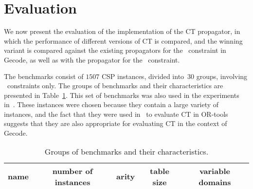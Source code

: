 \documentclass[a4paper,11pt]{article}
\theoremstyle{definition}
\newcommand{\Table}{\Constraint{Table}}
\newcommand{\CTpaper}[0]{DBLP:conf/cp/DemeulenaereHLP16}
\numberwithin{equation}{section}
\begin{document}








\section{Evaluation}
\label{evaluation}

We now present the evaluation of the implementation of the CT propagator,
in which the performance of different versions of CT is compared,
and the winning variant is compared against the existing propagators for
the \Table~constraint in Gecode, as well as with the propagator for the
~constraint.

The benchmarks consist of $1507$ CSP instances, divided into~$30$ groups,
involving \Table~constraints only.
The groups of benchmarks and their characteristics are presented in
Table~\ref{tab:benchmarks}.
This set of benchmarks was also used in the
experiments in~\cite{\CTpaper}.
These instances were chosen because
they contain a large variety of instances,
and the fact that they were used in~\cite{\CTpaper}
to evaluate CT in OR-tools
suggests that they are also appropriate for evaluating CT
in the context of Gecode.

\begin{table}[t]%
  \caption{Groups of benchmarks and their characteristics.}
  \label{tab:benchmarks}

  \begin{sideways}
    \centering
    \begin{tabular}{lcccc}  %
      name & number of instances & arity & table size & variable domains \\
      \midrule
      
    \end{tabular}
  \end{sideways}
\end{table}
\end{document}
